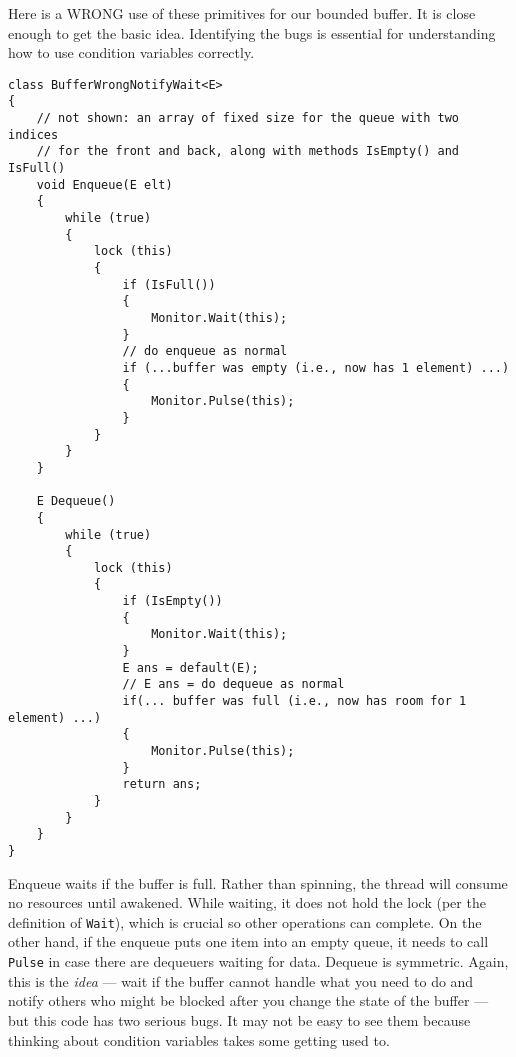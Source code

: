\documentclass[10pt]{article}
\begin{document}
Here is a WRONG use of these primitives for our bounded buffer.  It is
close enough to get the basic idea. Identifying the bugs is
essential for understanding how to use condition variables correctly.
\begin{verbatim}
class BufferWrongNotifyWait<E>
{
    // not shown: an array of fixed size for the queue with two indices
    // for the front and back, along with methods IsEmpty() and IsFull()
    void Enqueue(E elt)
    {
        while (true)
        {
            lock (this)
            {
                if (IsFull())
                {
                    Monitor.Wait(this);
                }
                // do enqueue as normal
                if (...buffer was empty (i.e., now has 1 element) ...)
                {
                    Monitor.Pulse(this);
                }
            }
        }
    }

    E Dequeue()
    {
        while (true)
        {
            lock (this)
            {
                if (IsEmpty())
                {
                    Monitor.Wait(this);
                }
                E ans = default(E);
                // E ans = do dequeue as normal
                if(... buffer was full (i.e., now has room for 1 element) ...)
                {
                    Monitor.Pulse(this);
                }
                return ans;
            }
        }
    }
}
\end{verbatim}
Enqueue waits if the buffer is full.  Rather than spinning, the thread
will consume no resources until awakened.  While waiting, it does not
hold the lock (per the definition of {\tt Wait}), which is crucial so
other operations can complete.  On the other hand, if the enqueue puts
one item into an empty queue, it needs to call {\tt Pulse} in case
there are dequeuers waiting for data.  Dequeue is symmetric.  Again,
this is the \emph{idea} --- wait if the buffer cannot handle what you
need to do and notify others who might be blocked after you change the
state of the buffer --- but this code has two serious bugs.  It may
not be easy to see them because thinking about condition variables
takes some getting used to.
\end{document}
